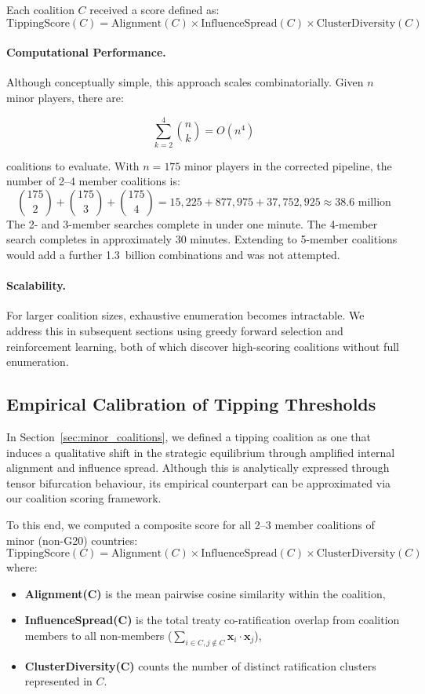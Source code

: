 \documentclass[11pt]{article}
\begin{document}
Each coalition \( C \) received a score defined as:
\[
\text{TippingScore}(C) = \text{Alignment}(C) \times \text{InfluenceSpread}(C) \times \text{ClusterDiversity}(C)
\]

\paragraph{Computational Performance.}
Although conceptually simple, this approach scales combinatorially. Given \( n \) minor players, there are:

\[
\sum_{k=2}^4 \binom{n}{k} = O(n^4)
\]

coalitions to evaluate. With \( n = 175 \) minor players in the corrected pipeline, the number of 2--4 member coalitions is:
\[
\binom{175}{2} + \binom{175}{3} + \binom{175}{4} = 15{,}225 + 877{,}975 + 37{,}752{,}925 \approx 38.6 \text{ million}
\]
The 2- and 3-member searches complete in under one minute. The 4-member search completes in approximately 30 minutes. Extending to 5-member coalitions would add a further 1.3~billion combinations and was not attempted.

\paragraph{Scalability.}
For larger coalition sizes, exhaustive enumeration becomes intractable. We address this in subsequent sections using greedy forward selection and reinforcement learning, both of which discover high-scoring coalitions without full enumeration.

\subsection{Empirical Calibration of Tipping Thresholds}
\label{sec:empirical_tipping_threshold}

In Section~\ref{sec:minor_coalitions}, we defined a tipping coalition as one that induces a qualitative shift in the strategic equilibrium through amplified internal alignment and influence spread. Although this is analytically expressed through tensor bifurcation behaviour, its empirical counterpart can be approximated via our coalition scoring framework.

To this end, we computed a composite score for all 2–3 member coalitions of minor (non-G20) countries:
\[
\text{TippingScore}(C) = \text{Alignment}(C) \times \text{InfluenceSpread}(C) \times \text{ClusterDiversity}(C)
\]
where:
\begin{itemize}
	\item \textbf{Alignment(C)} is the mean pairwise cosine similarity within the coalition,
	\item \textbf{InfluenceSpread(C)} is the total treaty co-ratification overlap from coalition members to all non-members ($\sum_{i \in C, j \notin C} \mathbf{x}_i \cdot \mathbf{x}_j$),
	\item \textbf{ClusterDiversity(C)} counts the number of distinct ratification clusters represented in \( C \).
\end{itemize}
\end{document}
